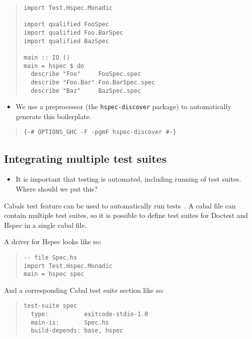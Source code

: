 \documentclass[preprint]{sigplanconf}
\begin{document}
\begin{quote}
\small
\begin{verbatim}
import Test.Hspec.Monadic

import qualified FooSpec
import qualified Foo.BarSpec
import qualified BazSpec

main :: IO ()
main = hspec $ do
  describe "Foo"     FooSpec.spec
  describe "Foo.Bar" Foo.BarSpec.spec
  describe "Baz"     BazSpec.spec
\end{verbatim}
\end{quote}

\begin{itemize}
\item We use a preprocessor (the {\tt hspec-discover} package) to automatically generate this boilerplate.
\end{itemize}

\begin{quote}
\small
\begin{verbatim}
{-# OPTIONS_GHC -F -pgmF hspec-discover #-}
\end{verbatim}
\end{quote}

\subsection{Integrating multiple test suites}

\begin{itemize}

\item It is important that testing is automated, including running of test
    suites.  Where should we put this?
\end{itemize}

\noindent Cabals test feature can be used to automatically run tests~\cite{cabal}.  A cabal
file can contain multiple test suites, so it is possible to define test suites
for Doctest and Hspec in a single cabal file.

A driver for Hspec looks like so:

\begin{quote}
\small
\begin{verbatim}
-- file Spec.hs
import Test.Hspec.Monadic
main = hspec spec
\end{verbatim}
\end{quote}

\noindent And a corresponding Cabal test suite section like so:

\begin{quote}
\small
\begin{verbatim}
test-suite spec
  type:          exitcode-stdio-1.0
  main-is:       Spec.hs
  build-depends: base, hspec
\end{verbatim}
\end{quote}
\end{document}
